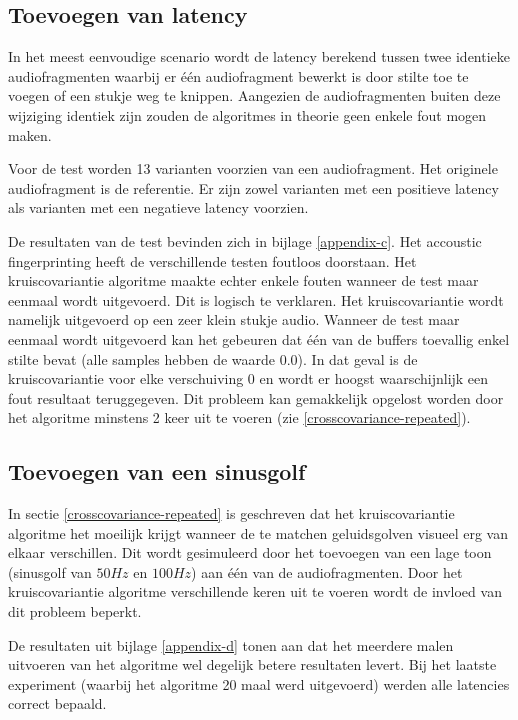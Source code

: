 \subsection{Toevoegen van latency}

In het meest eenvoudige scenario wordt de latency berekend tussen twee identieke audiofragmenten waarbij er één audiofragment bewerkt is door stilte toe te voegen of een stukje weg te knippen. Aangezien de audiofragmenten buiten deze wijziging identiek zijn zouden de algoritmes in theorie geen enkele fout mogen maken.

Voor de test worden 13 varianten voorzien van een audiofragment. Het originele audiofragment is de referentie. Er zijn zowel varianten met een positieve latency als varianten met een negatieve latency voorzien.

De resultaten van de test bevinden zich in bijlage \ref{appendix-c}. Het accoustic fingerprinting heeft de verschillende testen foutloos doorstaan. Het kruiscovariantie algoritme maakte echter enkele fouten wanneer de test maar eenmaal wordt uitgevoerd. Dit is logisch te verklaren. Het kruiscovariantie wordt namelijk uitgevoerd op een zeer klein stukje audio. Wanneer de test maar eenmaal wordt uitgevoerd kan het gebeuren dat één van de buffers toevallig enkel stilte bevat (alle samples hebben de waarde 0.0). In dat geval is de kruiscovariantie voor elke verschuiving 0 en wordt er hoogst waarschijnlijk een fout resultaat teruggegeven. Dit probleem kan gemakkelijk opgelost worden door het algoritme minstens 2 keer uit te voeren (zie \ref{crosscovariance-repeated}).

\subsection{Toevoegen van een sinusgolf}

In sectie \ref{crosscovariance-repeated} is geschreven dat het kruiscovariantie algoritme het moeilijk krijgt wanneer de te matchen geluidsgolven visueel erg van elkaar verschillen. Dit wordt gesimuleerd door het toevoegen van een lage toon (sinusgolf van $50Hz$ en $100Hz$) aan één van de audiofragmenten. Door het kruiscovariantie algoritme verschillende keren uit te voeren wordt de invloed van dit probleem beperkt.

De resultaten uit bijlage \ref{appendix-d} tonen aan dat het meerdere malen uitvoeren van het algoritme wel degelijk betere resultaten levert. Bij het laatste experiment (waarbij het algoritme 20 maal werd uitgevoerd) werden alle latencies correct bepaald.

